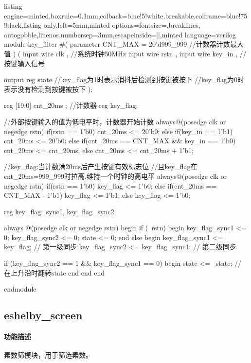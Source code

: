 \documentclass[a4paper]{article}
\begin{document}
\begin{tcblisting}{listing engine=minted,boxrule=0.1mm,colback=blue!5!white,breakable,colframe=blue!75!black,listing only,left=5mm,minted options={fontsize=\small,breaklines, autogobble,linenos,numbersep=3mm,escapeinside=||},minted language=verilog}
    module key_filter
    #(
    parameter CNT_MAX = 20'd999_999 //计数器计数最大值
    )
    (
    input wire clk , //系统时钟50MHz
    input wire rstn ,
    input wire key_in , //按键输入信号

    output reg state //key_flag为1时表示消抖后检测到按键被按下
    //key_flag为0时表示没有检测到按键被按下
    );


    reg [19:0] cnt_20ms ; //计数器
    reg key_flag;


    //外部按键输入的值为低电平时，计数器开始计数
    always@(posedge clk or negedge rstn)
    if(rstn == 1'b0) cnt_20ms <= 20'b0;
    else if(key_in == 1'b1) cnt_20ms <= 20'b0;
    else if(cnt_20ms == CNT_MAX && key_in == 1'b0) cnt_20ms <= cnt_20ms;
    else cnt_20ms <= cnt_20ms + 1'b1;

    //key_flag:当计数满20ms后产生按键有效标志位
    //且key_flag在cnt_20ms=999_999时拉高,维持一个时钟的高电平
    always@(posedge clk or negedge rstn)
    if(rstn == 1'b0)
    key_flag <= 1'b0;
    else if(cnt_20ms == CNT_MAX - 1'b1)
    key_flag <= 1'b1;
    else
    key_flag <= 1'b0;

    reg key_flag_sync1, key_flag_sync2;

    always @(posedge clk or negedge rstn) begin
        if (~rstn) begin
            key_flag_sync1 <= 0;
            key_flag_sync2 <= 0;
            state <= 0;
        end else begin
            key_flag_sync1 <= key_flag;  // 第一级同步
            key_flag_sync2 <= key_flag_sync1;  // 第二级同步

            if (key_flag_sync2 == 1 && key_flag_sync1 == 0) begin
                state <= ~state;  // 在上升沿时翻转state
            end
        end
    end


    endmodule
\end{tcblisting}

\subsection{eshelby\_screen}

\paragraph{功能描述} 素数筛模块，用于筛选素数。
\end{document}
